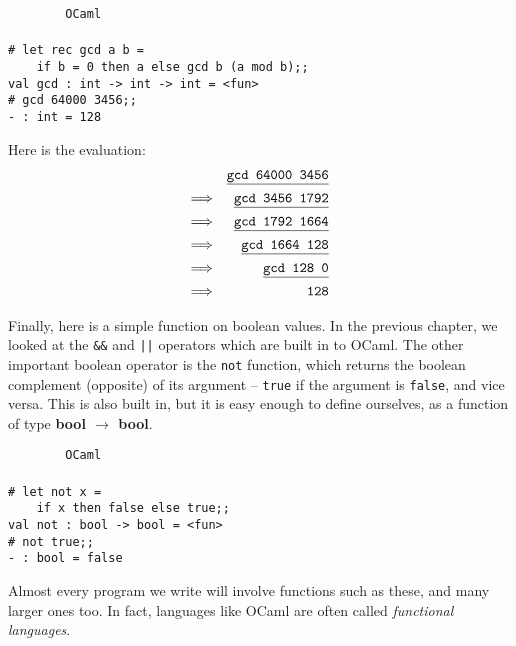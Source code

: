 \documentclass[]{book}
\newcommand{\smspace}{\vspace{4mm}}
\begin{document}
\smspace
\noindent\verb!        OCaml!\\
\noindent\\
\noindent\verb!# let rec gcd a b =!\\
\noindent\verb!    if b = 0 then a else gcd b (a mod b);;!\\
\noindent\verb!val gcd : int -> int -> int = <fun>!\\
\noindent\texttt{\# gcd 64000 3456;;}\\
\noindent\verb!- : int = 128!
\smspace

\noindent Here is the evaluation:
\begin{eqnarray*}
 & & \texttt{\underline{\vphantom{g}gcd 64000 3456}} \\
 \Longrightarrow & & \texttt{\underline{\vphantom{g}gcd 3456 1792}} \\
 \Longrightarrow & & \texttt{\underline{\vphantom{g}gcd 1792 1664}} \\
 \Longrightarrow & & \texttt{\underline{\vphantom{g}gcd 1664 128}} \\
 \Longrightarrow & & \texttt{\underline{\vphantom{g}gcd 128 0}} \\
 \Longrightarrow & & \texttt{128}
\end{eqnarray*}

\noindent Finally, here is a simple function on boolean values. In the previous chapter, we looked at the \texttt{\&\&} and \texttt{||} operators which are built in to OCaml. The other important boolean operator is the \texttt{not} function, which returns the boolean complement (opposite) of its argument -- \texttt{true} if the argument is \texttt{false}, and vice versa. This is also built in, but it is easy enough to define ourselves, as a function of type \textsf{\textbf{bool $\rightarrow$ bool}}.

\smspace
\noindent\verb!        OCaml!\\
\noindent\\
\noindent\verb!# let not x =!\\
\noindent\verb!    if x then false else true;;!\\
\noindent\verb!val not : bool -> bool = <fun>!\\
\noindent\texttt{\# not true;;}\\
\noindent\verb!- : bool = false!
\smspace

\noindent Almost every program we write will involve functions such as these, and many larger ones too. In fact, languages like OCaml are often called \textit{functional languages}.
\end{document}
